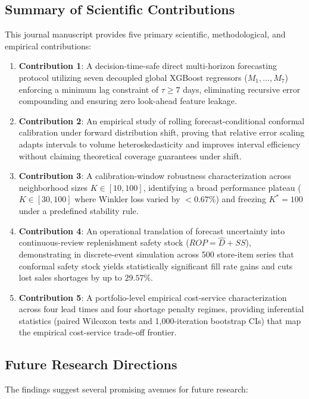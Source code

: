 \subsection{Summary of Scientific Contributions}
This journal manuscript provides five primary scientific, methodological, and empirical contributions:

\begin{enumerate}
    \item \textbf{Contribution 1}: A decision-time-safe direct multi-horizon forecasting protocol utilizing seven decoupled global XGBoost regressors ($M_1,\dots,M_7$) enforcing a minimum lag constraint of $\tau \ge 7$ days, eliminating recursive error compounding and ensuring zero look-ahead feature leakage.
    \item \textbf{Contribution 2}: An empirical study of rolling forecast-conditional conformal calibration under forward distribution shift, proving that relative error scaling adapts intervals to volume heteroskedasticity and improves interval efficiency without claiming theoretical coverage guarantees under shift.
    \item \textbf{Contribution 3}: A calibration-window robustness characterization across neighborhood sizes $K \in [10, 100]$, identifying a broad performance plateau ($K \in [30, 100]$ where Winkler loss varied by $<0.67\%$) and freezing $K^*=100$ under a predefined stability rule.
    \item \textbf{Contribution 4}: An operational translation of forecast uncertainty into continuous-review replenishment safety stock ($ROP = \hat{D} + SS$), demonstrating in discrete-event simulation across 500 store-item series that conformal safety stock yields statistically significant fill rate gains and cuts lost sales shortages by up to $29.57\%$.
    \item \textbf{Contribution 5}: A portfolio-level empirical cost-service characterization across four lead times and four shortage penalty regimes, providing inferential statistics (paired Wilcoxon tests and 1,000-iteration bootstrap CIs) that map the empirical cost-service trade-off frontier.
\end{enumerate}

\subsection{Future Research Directions}
The findings suggest several promising avenues for future research:

